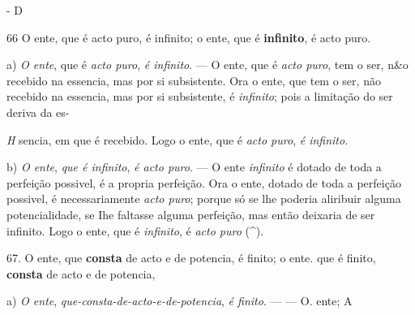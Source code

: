 - D

 66 O ente, que é acto puro, é infinito; o ente, que é \textbf{infinito}, é acto puro.

a) \emph{O ente}, que é \emph{acto puro}, \emph{é infinito}. --- O ente, que é \emph{acto puro}, tem o ser, n\&o recebido na essencia, mas por si subsistente. Ora o ente, que tem o ser, não recebido na essencia, mas por si subsistente, é \emph{infinito}; pois a limitação do ser deriva da es-

\emph{H} sencia, em que é recebido. Logo o ente, que é \emph{acto puro}, \emph{é infinito}.

b) \emph{O ente}, \emph{que é infinito}, \emph{é acto puro}. --- O ente \emph{infinito} é dotado de toda a perfeição possivel, é a propria perfeição. Ora o ente, dotado de toda a perfeição possivel, é necessariamente \emph{acto puro}; porque só se lhe poderia aliribuir alguma potencialidade, se Ihe faltasse alguma perfeição, mas então deixaria de ser infinito. Logo o ente, que é \emph{infinito}, é \emph{acto puro} (\textasciicircum{}).

67. O ente, que \textbf{consta} de acto e de potencia, é finito; o ente. que é finito, \textbf{consta} de acto e de potencia,

a) \emph{O ente}, \emph{que-consta-de-acto-e-de-potencia}, \emph{é finito}. --- --- O. ente; A

